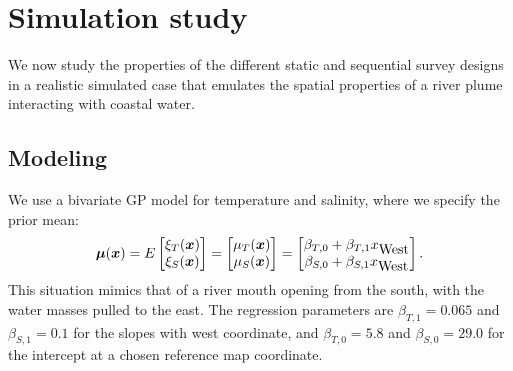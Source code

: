 \documentclass[aoas]{imsart}
\begin{document}
\section{Simulation study}
\label{sec:simulations}

We now study the properties of
the different static and sequential survey designs in a realistic
simulated case that emulates the spatial properties of a river plume interacting with coastal water.

\subsection{Modeling}

We use a bivariate GP model for temperature and salinity, where we
specify the prior mean:
\begin{equation}\label{m}
    \bmu(\bx)=E 
    \begin{bmatrix}
    \xi_T(\bx) \\
    \xi_S(\bx) 
    \end{bmatrix}=\begin{bmatrix} \mu_{T}(\bx)\\
\mu_{S}(\bx)
\end{bmatrix} 
= \begin{bmatrix} \beta_{T,0} + \beta_{T,1} x_{\mbox{West}} \\
\beta_{S,0} + \beta_{S,1} x_{\mbox{West}}
\end{bmatrix}.
\end{equation}
This situation
mimics that of a river mouth opening from the south, with the water
masses pulled to the east. The regression parameters are  $\beta_{T,1}=0.065$ and
$\beta_{S,1}=0.1$ for the slopes with west coordinate, and $\beta_{T,0}=5.8$
and $\beta_{S,0}=29.0$ for the intercept at a chosen reference map coordinate.

\end{document}
